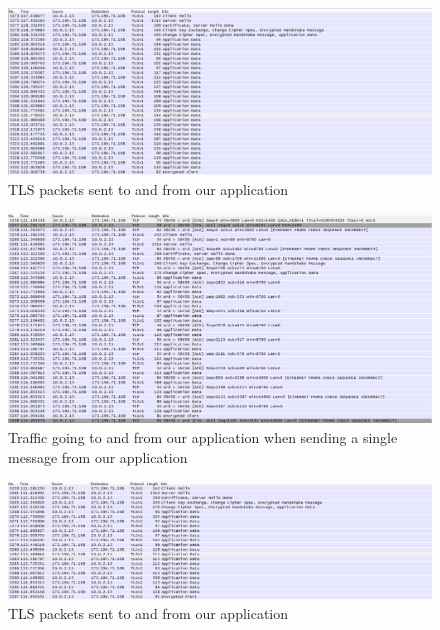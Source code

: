 \begin{figure}[h!]
\begin{center}
\includegraphics[height=0.6\textwidth, angle=-90]{ws3}
\end{center}
\caption{TLS packets sent to and from our application} \label{fig:ws3}
\end{figure}

\begin{figure}[h!]
\begin{center}
\includegraphics[height=0.6\textwidth, angle=-90]{ws4}
\end{center}
\caption{Traffic going to and from our application when sending a single message from our application} \label{fig:ws4}
\end{figure}

\begin{figure}[h!]
\begin{center}
\includegraphics[height=0.6\textwidth, angle=-90]{ws5}
\end{center}
\caption{TLS packets sent to and from our application} \label{fig:ws5}
\end{figure}